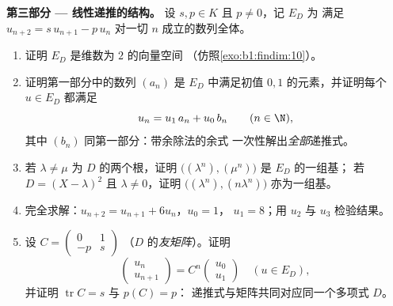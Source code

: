 \begin{problem}
\medskip
\noindent\textbf{第三部分 --- 线性递推的结构。}
设 $s, p \in K$ 且 $p \neq 0$，记 $E_D$ 为
满足 $u_{n+2} = s\,u_{n+1} - p\,u_n$ 对一切 $n$ 成立的数列全体。
\begin{enumerate}[resume]
  \item 证明 $E_D$ 是维数为 $2$ 的向量空间
        （仿照\cref{exo:b1:findim:10}）。
  \item 证明第一部分中的数列 $(a_n)$ 是
        $E_D$ 中满足初值 $0, 1$ 的元素，并证明每个 $u
        \in E_D$ 都满足
        \[
        u_n = u_1\,a_n + u_0\,b_n \qquad (n \in \N),
        \]
        其中 $(b_n)$ 同第一部分：带余除法的余式
        一次性解出\emph{全部}递推式。
  \item 若 $\lambda \neq \mu$ 为 $D$ 的两个根，证明
        $\bigl((\lambda^n), (\mu^n)\bigr)$ 是 $E_D$ 的一组基；
        若 $D = (X-\lambda)^2$ 且 $\lambda \neq 0$，证明
        $\bigl((\lambda^n), (n\lambda^n)\bigr)$ 亦为一组基。
  \item 完全求解：$u_{n+2} = u_{n+1} + 6u_n$，$u_0 = 1$，
        $u_1 = 8$；用 $u_2$ 与 $u_3$ 检验结果。
  \item 设 $C = \begin{pmatrix} 0 & 1\\ -p & s\end{pmatrix}$
        （$D$ 的\emph{友矩阵}）。证明
        \[
        \begin{pmatrix} u_{n}\\ u_{n+1}\end{pmatrix}
        = C^n \begin{pmatrix} u_0\\ u_1\end{pmatrix}
        \quad (u \in E_D),
        \]
        并证明 $\operatorname{tr} C = s$ 与 $p(C) = p$：
        递推式与矩阵共同对应同一个多项式 $D$。
\end{enumerate}


\end{problem}
